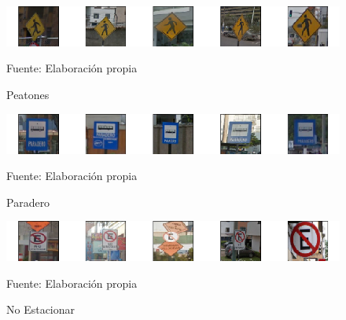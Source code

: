 			\begin{figure}[H]
				\begin{center}
				\includegraphics[width=1\textwidth]{images/desarrollo/imagenes/peru/1__(4).png}
				\end{center}
				\begin{center}
				\caption{\small{Peatones}}
				\vskip -0.25cm
				{\small{Fuente: Elaboración propia}}
				\end{center}
				\vspace{-1.5em}
			\end{figure}
			
			\begin{figure}[H]
				\begin{center}
				\includegraphics[width=1\textwidth]{images/desarrollo/imagenes/peru/1__(5).png}
				\end{center}
				\begin{center}
				\caption{\small{Paradero}}
				\vskip -0.25cm
				{\small{Fuente: Elaboración propia}}
				\end{center}
				\vspace{-1.5em}
			\end{figure}

			\begin{figure}[H]
				\begin{center}
				\includegraphics[width=1\textwidth]{images/desarrollo/imagenes/peru/1__(6).png}
				\end{center}
				\begin{center}
				\caption{\small{No Estacionar}}
				\vskip -0.25cm
				{\small{Fuente: Elaboración propia}}
				\end{center}
				\vspace{-1.5em}
			\end{figure}
			
